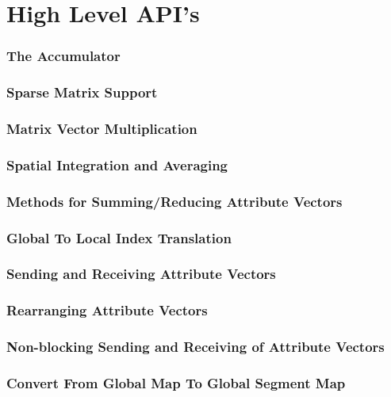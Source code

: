 \documentclass{article}
\begin{document}
\part{High Level API's}
\section{The Accumulator}



\section{Sparse Matrix Support}




%
\section{Matrix Vector Multiplication}

%
\section{Spatial Integration and Averaging}

%
\section{Methods for Summing/Reducing Attribute Vectors}

%
\section{Global To Local Index Translation}

%
\section{Sending and Receiving Attribute Vectors}



%
\section{Rearranging Attribute Vectors}

%
\section{Non-blocking Sending and Receiving of Attribute Vectors}

%
\section{Convert From Global Map To Global Segment Map}



 
%
\end{document}
